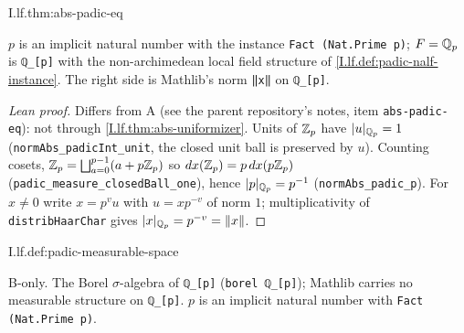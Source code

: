 \begin{theorem}
\end{theorem}
\begin{tfformal}{I.lf.thm:abs-padic-eq}
\begin{tffidelity}
$p$ is an implicit natural number with the instance \texttt{Fact (Nat.Prime p)}; $F=\mathbb{Q}_p$ is \texttt{ℚ\_[p]} with the non-archimedean local field structure of \cref{I.lf.def:padic-nalf-instance}. The right side is Mathlib's norm \texttt{‖x‖} on \texttt{ℚ\_[p]}.
\end{tffidelity}
\end{tfformal}
\begin{proof}[Lean proof]
Differs from A (see the parent repository's notes, item \texttt{abs-padic-eq}): not through \cref{I.lf.thm:abs-uniformizer}. Units of $\mathbb{Z}_p$ have $|u|_{\mathbb{Q}_p}=1$ (\texttt{normAbs\_padicInt\_unit}, the closed unit ball is preserved by $u$). Counting cosets, $\mathbb{Z}_p=\bigsqcup_{a=0}^{p-1}(a+p\mathbb{Z}_p)$ so $dx(\mathbb{Z}_p)=p\,dx(p\mathbb{Z}_p)$ (\texttt{padic\_measure\_closedBall\_one}), hence $|p|_{\mathbb{Q}_p}=p^{-1}$ (\texttt{normAbs\_padic\_p}). For $x\ne0$ write $x=p^{v}u$ with $u=xp^{-v}$ of norm $1$; multiplicativity of \texttt{distribHaarChar} gives $|x|_{\mathbb{Q}_p}=p^{-v}=\|x\|$.
\end{proof}

\begin{definition}
\bonly
{}
\end{definition}
\begin{tfformal}{I.lf.def:padic-measurable-space}
\begin{tffidelity}
B-only. The Borel $\sigma$-algebra of \texttt{ℚ\_[p]} (\texttt{borel ℚ\_[p]}); Mathlib carries no measurable structure on \texttt{ℚ\_[p]}. $p$ is an implicit natural number with \texttt{Fact (Nat.Prime p)}.
\end{tffidelity}
\end{tfformal}

